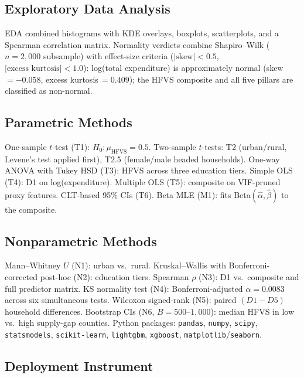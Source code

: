 \documentclass[3p,twocolumn,10pt]{elsarticle}
\begin{document}
\subsection{Exploratory Data Analysis}

EDA combined histograms with KDE overlays, boxplots, scatterplots, and a Spearman
correlation matrix. Normality verdicts combine Shapiro--Wilk ($n=2{,}000$ subsample) with
effect-size criteria ($|\text{skew}|<0.5$, $|\text{excess kurtosis}|<1.0$): log(total
expenditure) is approximately normal (skew\,$=-0.058$, excess kurtosis\,$=0.409$); the
HFVS composite and all five pillars are classified as non-normal.

\subsection{Parametric Methods}

One-sample $t$-test (T1): $H_0\colon\mu_\text{HFVS}=0.5$. Two-sample $t$-tests: T2
(urban/rural, Levene's test applied first), T2.5 (female/male headed households). One-way
ANOVA with Tukey HSD (T3): HFVS across three education tiers. Simple OLS (T4): D1 on
log(expenditure). Multiple OLS (T5): composite on VIF-pruned proxy features. CLT-based
95\% CIs (T6). Beta MLE (M1): fits Beta$(\hat\alpha,\hat\beta)$ to the composite.

\subsection{Nonparametric Methods}

Mann--Whitney $U$ (N1): urban vs.\ rural. Kruskal--Wallis with Bonferroni-corrected
post-hoc (N2): education tiers. Spearman $\rho$ (N3): D1 vs.\ composite and full
predictor matrix. KS normality test (N4): Bonferroni-adjusted $\alpha=0.0083$ across six
simultaneous tests. Wilcoxon signed-rank (N5): paired $(D1-D5)$ household differences.
Bootstrap CIs (N6, $B=500$--$1{,}000$): median HFVS in low vs.\ high supply-gap counties.
Python packages: \texttt{pandas}, \texttt{numpy}, \texttt{scipy}, \texttt{statsmodels},
\texttt{scikit-learn}, \texttt{lightgbm}, \texttt{xgboost}, \texttt{matplotlib}/\texttt{seaborn}.

\subsection{Deployment Instrument}
\end{document}
